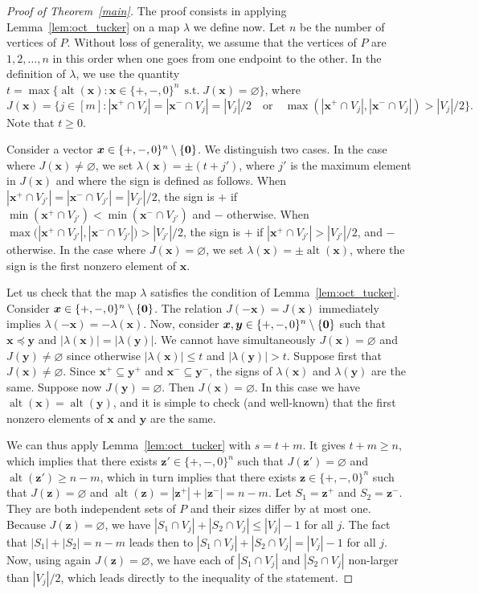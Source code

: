 \documentclass[12pt]{amsart}
\theoremstyle{remark}
\def\zero{{\bf 0}}
\def\x{\boldsymbol{x}}
\def\y{\boldsymbol{y}}
\def\z{\boldsymbol{z}}
\def\alt{\operatorname{alt}}
\begin{document}
\begin{proof}[Proof of Theorem~\ref{main}]
The proof consists in applying Lemma~\ref{lem:oct_tucker} on a map $\lambda$ we define now. Let $n$ be the number of vertices of $P$. Without loss of generality, we assume that the vertices of $P$ are $1,2,\ldots,n$ in this order when one goes from one endpoint to the other. In the definition of $\lambda$, we use the quantity $t=\max\big\{\alt(\x)\colon \x\in\{+,-,0\}^n\;\,\mbox{s.t.}\;J(\x)=\varnothing\big\}$, where $$J(\x)=\Big\{j\in[m]\colon |\x^+\cap V_j|=|\x^-\cap V_j|=|V_j|/2\quad\mbox{or}\quad\max(|\x^+\cap V_j|,|\x^-\cap V_j|)>|V_j|/2\Big\}.$$ Note that $t\geq 0$.

Consider a vector $\x\in\{+,-,0\}^n\setminus\{\zero\}$. We distinguish two cases.
In the case where $J(\x)\neq\varnothing$, we set  $\lambda(\x)=\pm (t+j')$, where $j'$ is the maximum element in $J(\x)$ and where the sign is defined as follows. When $|\x^+\cap V_{j'}|=|\x^-\cap V_{j'}|=|V_{j'}|/2$, the sign is $+$ if $\min(\x^+\cap V_{j'})<\min(\x^-\cap V_{j'})$ and $-$ otherwise. When $\max\big(|\x^+\cap V_{j'}|,|\x^-\cap V_{j'}|\big)>|V_{j'}|/2$, the sign is $+$ if $|\x^+\cap V_{j'}|>|V_{j'}|/2$, and $-$ otherwise.
In the case where $J(\x)=\varnothing$, we set $\lambda(\x)=\pm\alt(\x)$, where the sign is the first nonzero element of $\x$.

Let us check that the map $\lambda$ satisfies the condition of Lemma~\ref{lem:oct_tucker}. Consider $\x\in\{+,-,0\}^n\setminus\{\zero\}$. The relation $J(-\x)=J(\x)$ immediately implies $\lambda(-\x)=-\lambda(\x)$. Now, consider $\x,\y\in\{+,-,0\}^n\setminus\{\zero\}$ such that $\x\preceq\y$ and $|\lambda(\x)|=|\lambda(\y)|$. We cannot have simultaneously $J(\x)=\varnothing$ and $J(\y)\neq\varnothing$ since otherwise $|\lambda(\x)|\leq t$ and $|\lambda(\y)|>t$. Suppose first that $J(\x)\neq\varnothing$. Since $\x^+\subseteq\y^+$ and $\x^-\subseteq\y^-$, the signs of $\lambda(\x)$ and $\lambda(\y)$ are the same. Suppose now $J(\y)=\varnothing$. Then $J(\x)=\varnothing$. In this case we have $\alt(\x)=\alt(\y)$, and it is simple to check (and well-known) that the first nonzero elements of $\x$ and $\y$ are the same.

We can thus apply Lemma~\ref{lem:oct_tucker} with $s=t+m$. It gives $t+m\geq n$, which implies that there exists $\z'\in\{+,-,0\}^n$ such that $J(\z')=\varnothing$ and $\alt(\z')\geq n-m$, which in turn implies that there exists $\z\in\{+,-,0\}^n$ such that $J(\z)=\varnothing$ and $\alt(\z)=|\z^+|+|\z^-|=n-m$. 
Let $S_1=\z^+$ and $S_2=\z^-$. They are both independent sets of $P$ and their sizes differ by at most one. 
Because $J(\z)=\varnothing$, we have $|S_1\cap V_j|+|S_2\cap V_j|\leq |V_j|-1$ for all $j$. The fact that $|S_1|+|S_2|=n-m$ leads then to $|S_1\cap V_j|+|S_2\cap V_j|=|V_j|-1$ for all $j$. Now, using again $J(\z)=\varnothing$, we have each of $|S_1\cap V_j|$ and $|S_2\cap V_j|$ non-larger than $|V_j|/2$, which leads directly to the inequality of the statement.
\end{proof}
\end{document}
